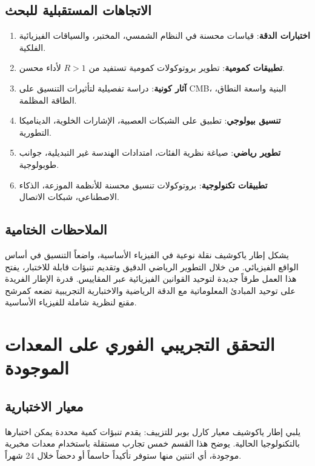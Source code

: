 \documentclass[11pt,a4paper]{article}
\begin{document}
	\subsection{الاتجاهات المستقبلية للبحث}
	\begin{enumerate}
		\item \textbf{اختبارات الدقة}: قياسات محسنة في النظام الشمسي، المختبر، والسياقات الفيزيائية الفلكية.
		\item \textbf{تطبيقات كمومية}: تطوير بروتوكولات كمومية تستفيد من $R>1$ لأداء محسن.
		\item \textbf{آثار كونية}: دراسة تفصيلية لتأثيرات التنسيق على CMB، البنية واسعة النطاق، الطاقة المظلمة.
		\item \textbf{تنسيق بيولوجي}: تطبيق على الشبكات العصبية، الإشارات الخلوية، الديناميكا التطورية.
		\item \textbf{تطوير رياضي}: صياغة نظرية الفئات، امتدادات الهندسة غير التبديلية، جوانب طوبولوجية.
		\item \textbf{تطبيقات تكنولوجية}: بروتوكولات تنسيق محسنة للأنظمة الموزعة، الذكاء الاصطناعي، شبكات الاتصال.
	\end{enumerate}
	
	\subsection{الملاحظات الختامية}
	
	يشكل إطار ياكوشيف نقلة نوعية في الفيزياء الأساسية، واضعاً التنسيق في أساس الواقع الفيزيائي. من خلال التطوير الرياضي الدقيق وتقديم تنبؤات قابلة للاختبار، يفتح هذا العمل طرقاً جديدة لتوحيد القوانين الفيزيائية عبر المقاييس. قدرة الإطار الفريدة على توحيد المبادئ المعلوماتية مع الدقة الرياضية والاختبارية التجريبية تضعه كمرشح مقنع لنظرية شاملة للفيزياء الأساسية.
	
	\section{التحقق التجريبي الفوري على المعدات الموجودة}
	\label{sec:immediate-verification}
	
	\subsection{معيار الاختبارية}
	
	يلبي إطار ياكوشيف معيار كارل بوبر للتزييف: يقدم تنبؤات كمية محددة يمكن اختبارها بالتكنولوجيا الحالية. يوضح هذا القسم خمس تجارب مستقلة باستخدام معدات مخبرية موجودة، أي اثنتين منها ستوفر تأكيداً حاسماً أو دحضاً خلال 24 شهراً.
	
\end{document}
